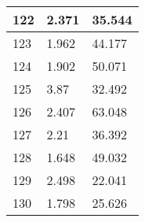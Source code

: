 \begin{table}[!ht]
\begin{tabular}{|l|l|l|}
        122 & 2.371 & 35.544 \\ \hline
        123 & 1.962 & 44.177 \\ \hline
        124 & 1.902 & 50.071 \\ \hline
        125 & 3.87 & 32.492 \\ \hline
        126 & 2.407 & 63.048 \\ \hline
        127 & 2.21 & 36.392 \\ \hline
        128 & 1.648 & 49.032 \\ \hline
        129 & 2.498 & 22.041 \\ \hline
        130 & 1.798 & 25.626 \\ \hline
    \end{tabular}
\end{table}

\endinput
